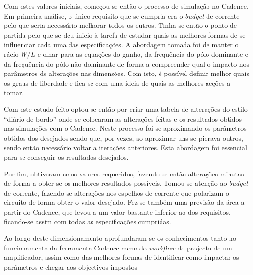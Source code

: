 \documentclass[11pt]{article}
\numberwithin{equation}{section}
\begin{document}
Com estes valores iniciais, começou-se então o processo de simulação no Cadence. Em primeira análise, o único requisito que se cumpria era o \textit{budget} de corrente pelo que seria necessário melhorar todos os outros.
Tinha-se então o ponto de partida pelo que se deu inicio à tarefa de estudar quais as melhores formas de se influenciar cada uma das especificações. A abordagem tomada foi de manter o rácio $W/L$ e olhar para as equações do ganho, da frequência do pólo dominante e da frequência do pólo não dominante de forma a compreender qual o impacto nos parâmetros de alterações nas dimensões. Com isto, é possível definir melhor quais os graus de liberdade e fica-se com uma ideia de quais as melhores acções a tomar.

Com este estudo feito optou-se então por criar uma tabela de alterações do estilo ``diário de bordo'' onde se colocaram as alterações feitas e os resultados obtidos nas simulações com o Cadence. Neste processo foi-se aproximando os parâmetros obtidos dos desejados sendo que, por vezes, ao aproximar uns se piorava outros, sendo então necessário voltar a iterações anteriores. Esta abordagem foi essencial para se conseguir os resultados desejados.

Por fim, obtiveram-se os valores requeridos, fazendo-se então alterações minutas de forma a obter-se os melhores resultados possíveis. Tomou-se atenção ao \textit{budget} de corrente, fazendo-se alterações nos espelhos de corrente que polarizam o circuito de forma obter o valor desejado. Fez-se também uma previsão da área a partir do Cadence, que levou a um valor bastante inferior ao dos requisitos, ficando-se assim com todas as especificações cumpridas.

Ao longo deste dimensionamento aprofundaram-se os conhecimentos tanto no funcionamento da ferramenta Cadence como do \textit{workflow} do projecto de um amplificador, assim como das melhores formas de identificar como impactar os parâmetros e chegar aos objectivos impostos.

\pagebreak

\listoftodos[Notes]
\end{document}
